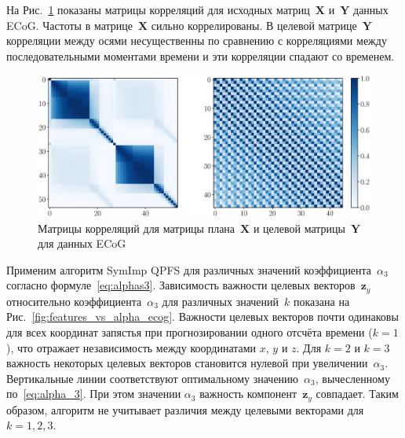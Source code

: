 \documentclass[preprint,12pt]{elsarticle}
\theoremstyle{definition}
\newcommand{\bz}{\mathbf{z}}
\newcommand{\bY}{\mathbf{Y}}
\newcommand{\bX}{\mathbf{X}}
\begin{document}
На Рис.~\ref{fig:corr_matrix} показаны матрицы корреляций для исходных матриц~$\bX$ и~$\bY$ данных ECoG. Частоты в матрице~$\bX$ сильно коррелированы. 
В целевой матрице~$\bY$ корреляции между осями несущественны по сравнению с корреляциями между последовательными моментами времени и эти корреляции спадают со временем.
\begin{figure}[h]
	\includegraphics[width=\linewidth]{figs/corr_matrix.eps}
	\caption{Матрицы корреляций для матрицы плана~$\bX$ и целевой матрицы~$\bY$ для данных ECoG}
	\label{fig:corr_matrix}
\end{figure}

Применим алгоритм SymImp QPFS для различных значений коэффициента~$\alpha_3$ согласно формуле~\eqref{eq:alphas3}.
Зависимость важности целевых векторов~$\bz_y$ относительно коэффициента~$\alpha_3$ для различных значений~$k$ показана на Рис.~\ref{fig:features_vs_alpha_ecog}.
Важности целевых векторов почти одинаковы для всех координат запястья при прогнозировании одного отсчёта времени ($k = 1$), 
что отражает независимость между координатами $x$, $y$ и $z$.
Для $k = 2$ и $k = 3$ важность некоторых целевых векторов становится нулевой при увеличении~$\alpha_3$.
Вертикальные линии соответствуют оптимальному значению~$\alpha_3$, вычесленному по~\eqref{eq:alpha_3}. 
При этом значении $\alpha_3$ важность компонент~$\bz_y$ совпадает. 
Таким образом, алгоритм не учитывает различия между целевыми векторами для $k=1, 2, 3$.
\end{document}
